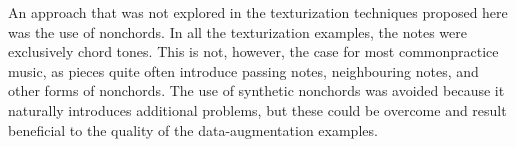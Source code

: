 
An approach that was not explored in the texturization
techniques proposed here was the use of \gls{nonchord}s. In
all the texturization examples, the notes were exclusively
chord tones. This is not, however, the case for most
\gls{commonpractice} music, as pieces quite often introduce
passing notes, neighbouring notes, and other forms of
\gls{nonchord}s. The use of synthetic \gls{nonchord}s was
avoided because it naturally introduces additional problems,
but these could be overcome and result beneficial to the
quality of the data-augmentation examples.
